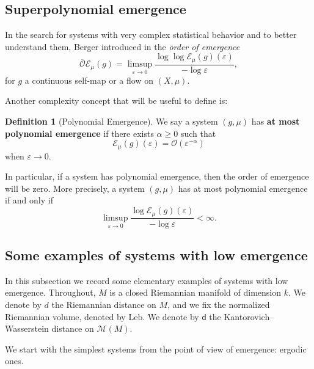 \documentclass[11pt,reqno]{amsart}
\theoremstyle{plain}
\theoremstyle{definition}
\newtheorem{definition}[theorem]{Definition}
\theoremstyle{remark}
\theoremstyle{plain}
\numberwithin{equation}{section}
\newcommand{\eps}{\varepsilon}
\begin{document}
\subsection{Superpolynomial emergence}


In the search for systems with very complex statistical behavior and to better understand them, Berger introduced in \cite{berger2020complexities} the \emph{order of emergence} 
\[
\overline{\mathcal{O}}\mathcal{E}_{\mu}(g)=\limsup_{\varepsilon\to 0}\frac{\log\log \mathcal{E}_{\mu}(g)(\varepsilon)}{-\log \varepsilon},
\]
for $g$ a continuous self-map or a flow on $(X,\mu)$. 

Another complexity concept that will be useful to define is:

\begin{definition}[Polynomial Emergence] \label{def: polynomial emergence}
	We say a system $(g,\mu)$ has \textbf{at most polynomial emergence} if there exists $\alpha \geq 0$ such that $$\mathcal{E}_{\mu}(g)(\eps)=\mathcal{O}( \eps^{-\alpha})$$ when $\eps \to 0$. 
\end{definition}

In particular, if a system has polynomial emergence, then the order of emergence will be zero. More precisely, a system $(g,\mu)$ has at most polynomial emergence if and only if
	\[
	\limsup_{\varepsilon\to 0}\frac{\log \mathcal{E}_{\mu}(g)(\varepsilon)}{-\log\varepsilon}<\infty.
	\]



\subsection{Some examples of systems with low emergence}
\label{subsection: examples of low emergence}

In this subsection we record some elementary examples of systems with low
emergence. Throughout, $M$ is a closed Riemannian manifold of dimension $k$.
We denote by $d$ the Riemannian distance on $M$, and we fix
the normalized Riemannian volume, denoted by $\mathrm{Leb}$. We denote by
$\mathsf d$ the Kantorovich--Wasserstein distance on $\mathcal M(M)$.

We start with the simplest systems from the point of view of emergence:
ergodic ones.
\end{document}
